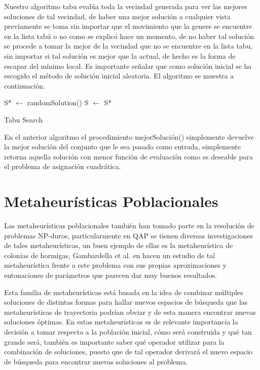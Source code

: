 \documentclass{ci5652}
\begin{document}
Nuestro algoritmo tabu evalúa toda la vecindad generada para ver las mejores soluciones de tal vecindad, de haber una mejor solución a cualquier vista previamente se toma sin importar que el movimiento que la genere se encuentre en la lista tabú o no como se explicó hace un momento, de no haber tal solución se procede a tomar la mejor de la vecindad que no se encuentre en la lista tabu, sin importar si tal solución es mejor que la actual, de hecho es la forma de escapar del mínimo local. Es importante señalar que como solución inicial se ha escogido el método de solución inicial aleatoria. El algoritmo se muestra a continuación.

\begin{algorithm}
 \DontPrintSemicolon
 \vspace*{0.1cm}
 S* $\leftarrow$ randomSolution()\;
 S $\leftarrow$ S*\;
 
 \vspace*{0.1cm}
 \caption{Tabu Search}
\end{algorithm}

En el anterior algoritmo el procedimiento mejorSolución() simplemente devuelve la mejor solución del conjunto que le sea pasado como entrada, simplemente retorna aquella solución con menor función de evaluación como es deseable para el problema de asignación cuadrática.


\section{Metaheurísticas Poblacionales}

Las metaheurísticas poblacionales también han tomado parte en la resolución de problemas NP-duros, particularmente en QAP se tienen diversas investigaciones de tales metaheurísticas, un buen ejemplo de ellas es la metaheurística de colonias de hormigas, Gambardella et al. en \cite{gambardella} hacen un estudio de tal metaheurística frente a este problema con sus propias aproximaciones y entonaciones de parámetros que parecen dar muy buenos resultados.

Esta familia de metaheurísticas está basada en la idea de combinar múltiples soluciones de distintas formas para hallar nuevos espacios de búsqueda que las metaheurísticas de trayectoria podrían obviar y de esta manera encontrar nuevas soluciones óptimas. En estas metaheurísticas es de relevante importancia la decisión a tomar respecto a la población inicial, cómo será construida y qué tan grande será, también es importante saber qué operador utilizar para la combinación de soluciones, puesto que de tal operador derivará el nuevo espacio de búsqueda para encontrar nuevas soluciones al problema.
\end{document}
